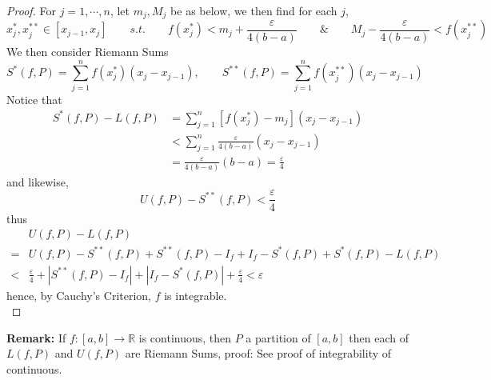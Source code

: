 \documentclass[12pt]{article}
\theoremstyle{plain}
\newcommand{\abs}[1]{\left| #1 \right|}
\newcommand{\ep}{\varepsilon}
\begin{document}
\begin{proof}
		For $j=1,\cdots, n$, let $m_j, M_j$ be as below, we then
		find for each $j$, 
		\[
		x_j^*, x_j^{**} \in [x_{j-1}, x_j] \qquad s.t. \qquad  
		f(x_j^*) < m_j +\frac{\ep}{4(b-a)} \qquad \& \qquad
		M_j - \frac{\ep}{4(b-a)} < f(x_j^{**})
		\]
		We then consider Riemann Sums
		\[
			S^*(f,P) = \sum_{j=1}^n f(x^*_j)(x_j-x_{j-1}), 
			\qquad S^{**}(f,P) = \sum_{j=1}^n f(x^{**}_j) (x_j-x_{j-1})
		\]
		Notice that 
		\begin{align*}
				S^*(f,P) - L(f,P) 
				&= \sum_{j=1}^n [f(x^*_j) - m_j](x_j-x_{j-1})\\
				&<\sum_{j=1}^n \frac{\ep}{4(b-a)}(x_j-x_{j-1})\\
				&= \frac{\ep}{4(b-a)} (b-a) = \frac{\ep}4
		\end{align*}
		and likewise, 
			\[
				U(f,P) -S^{**}(f,P) < \frac{\ep}4
			\]
			thus
			\begin{align*}
				&U(f,P) - L(f,P) \\
				=& U(f,P) - S^{**}(f,P) + S^{**}(f,P) - I_f
				+I_f-S^*(f,P)+S^*(f,P)-L(f,P) \\
				<& \frac{\ep}4 + \abs{S^{**}(f,P)-I_f}+\abs{I_f-S^*(f,P)}
				+\frac{\ep}4<\ep
			\end{align*}
			hence, by Cauchy's Criterion, $f$ is integrable. \\
	\end{proof}

	{\color{brown}
		\textbf{Remark:} If $f:[a,b] \to \mathbb{R}$ is continuous, then $P$ a 
	partition of $[a,b]$ then each of $L(f,P)$ and $U(f,P)$ are Riemann Sums, 
	proof: See proof of integrability of continuous. \\
	}
\end{document}
